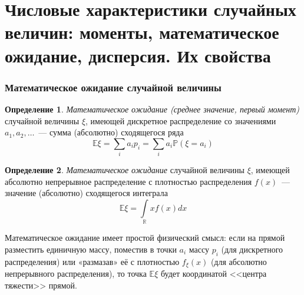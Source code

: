 \documentclass[oneside,final,14pt]{extreport}
\theoremstyle{plain}
\theoremstyle{definition}
\newtheorem*{defn}{Определение}
\theoremstyle{named}
\begin{document}
\section{Числовые характеристики случайных величин: моменты, математическое ожидание, дисперсия. Их свойства}

\subsubsection{Математическое ожидание случайной величины}
\begin{defn}
    {\it Математическое ожидание (среднее значение, первый момент)} случайной величины $\xi$, имеющей дискретное распределение со значениями $a_1, a_2, \ldots$~--- сумма (абсолютно) сходящегося ряда
    \begin{equation*}
        \mathbb{E} \xi=\sum\limits_{i} a_{i} p_{i}=\sum\limits_{i} a_{i} \mathbb{P}\left(\xi=a_{i}\right)
    \end{equation*}
\end{defn}

\begin{defn}
    {\it Математическое ожидание} случайной величины $\xi$, имеющей абсолютно непрерывное распределение с плотностью распределения $f(x)$~--- значение (абсолютно) сходящегося интеграла
    \begin{equation*}
        \mathbb{E} \xi=\int\limits_{\mathbb{R}} x f(x) dx
    \end{equation*}
\end{defn}

Математическое ожидание имеет простой физический смысл: если на прямой разместить единичную массу, поместив в точки $a_i$ массу $p_i$ (для дискретного распределения) или «размазав» её с плотностью $f_\xi(x)$ (для абсолютно непрерывного распределения), то точка $\mathbb{E}\xi$ будет координатой <<центра тяжести>> прямой.
\end{document}
